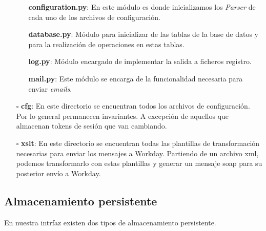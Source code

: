 \begin{itemize}
			\begin{itemize}
				\item [\textendash] \textbf{configuration.py}: En este módulo es donde inicializamos los \textit{Parser} de cada uno de los archivos de configuración.
				\item [\textendash] \textbf{database.py}: Módulo para inicializar de las tablas de la base de datos y para la realización de operaciones en estas tablas.
				\item [\textendash] \textbf{log.py}: Módulo encargado de implementar la salida a ficheros registro.
				\item [\textendash] \textbf{mail.py}: Este módulo se encarga de la funcionalidad necesaria para enviar \textit{emails}.
			\end{itemize}
			
	\item[$\square$] \textbf{cfg}: En este directorio se encuentran todos los archivos de configuración. 
	Por lo general permanecen invariantes. A excepción de aquellos que almacenan tokens de sesión que van cambiando.
	\item[$\square$] \textbf{xslt}: En este directorio se encuentran todas las plantillas de transformación necesarias para enviar los mensajes a Workday.
	Partiendo de un archivo xml, podemos transformarlo con estas plantillas y generar un mensaje \acrshort{soap} para su posterior envío a Workday.
	

\end{itemize}




\subsection{Almacenamiento persistente}

En nuestra intrfaz existen dos tipos de almacenamiento persistente. 

